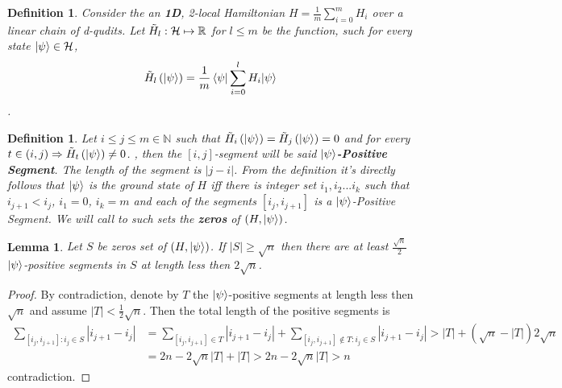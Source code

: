 \documentclass{article}
\newtheorem{lemma}[theorem]{Lemma}
\newtheorem{definition}[theorem]{Definition}
\begin{document}
\begin{definition} Consider the an \textbf{1D}, 2-local Hamiltonian \(H = \frac{1}{m}\sum^{m}_{i=0}{H_i}\) over a linear chain of d-qudits.   Let \( \tilde{H}_{l}:\mathcal{H} \mapsto \mathbb{R} \) for 
\( l \le m \) be the function, such for every state \( \ket{\psi} \in \mathcal{H} \), \begin{equation*}
    \tilde{H}_{l}\left(\ket{\psi}\right) = \frac{1}{m}\braket{\psi|\sum^{l}_{i=0}{H_i}|\psi} 
\end{equation*}  . 
\end{definition}

\begin{definition} Let \(i \le j \le m \in \mathbb{N} \) such that \( \tilde{H}_{i}\left(\ket{\psi}\right) = \tilde{H}_{j}\left(\ket{\psi}\right) = 0 \) and for every \( t \in (i,j) \Rightarrow  \tilde{H}_{t}\left(\ket{\psi}\right) \neq 0 \). , then the \([i,j]\)-segment will be said  \(\ket{\psi}\)\textbf{-Positive Segment}. The length of the segment is \( |j-i|\). From the definition it's directly follows that \(\ket{\psi}\) is the ground state of \(H\) iff there is integer set \( i_1 , i_2 ... i_k \) such that \(i_{j+1} < i_{j}\), \(i_{1} = 0\), \(i_{k} = m\) and each of the segments \( [i_{j},i_{j+1}] \) is a \(\ket{\psi}\)-Positive Segment. We will call to such sets the \textbf{zeros} of \( \left( H, \ket{\psi} \right) \).
\end{definition}

\begin{lemma} Let \(S\) be zeros set of \(\left( H, \ket{\psi} \right) \). If \(|S| \ge \sqrt{n} \) then there are at least \( \frac{\sqrt{n}}{2} \) \(\ket{\psi}\)-positive segments in \(S\) at length less then \(2\sqrt{n}\). 
\end{lemma}

\begin{proof} By contradiction, denote by \( T \) the \( \ket{\psi}\)-positive segments at length less then \( \sqrt{n}\) and assume \( |T|  < \frac{1}{2}\sqrt{n} \). Then the total length of the positive segments is \begin{equation*}
\begin{split}
    \sum_{[i_{j},i_{j+1}]:i_{j}\in S}{|i_{j+1}-i_{j}|} &= \sum_{[i_{j},i_{j+1}]\in T}{|i_{j+1}-i_{j}|}+\sum_{[i_{j},i_{j+1}] \notin T :i_{j}\in S}{|i_{j+1}-i_{j}|} > |T| + \left(\sqrt{n}-|T|\right)2\sqrt{n} \\ 
    &= 2n - 2\sqrt{n}|T| + |T| > 2n - 2\sqrt{n}|T| > n 
\end{split}
\end{equation*} contradiction.
\end{proof}
\end{document}
